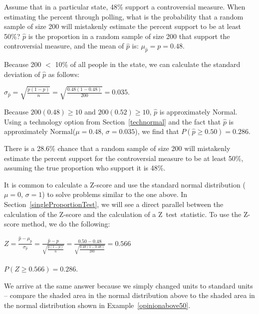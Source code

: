 \begin{examplewrap}
\begin{nexample}{Assume that in a particular state, 48\% support a controversial measure.  When estimating the percent through polling, what is the probability that a random sample of size 200 will mistakenly estimate the percent support to be at least 50\%?}
$\hat{p}$ is the proportion in a random sample of size 200 that support the controversial measure, and the mean of $\hat{p}$ is: $\mu_{\hat{p}} = p = 0.48$.

Because 200 $<$ 10\% of all people in the state, we can calculate the standard deviation of $\hat{p}$ as follows:
\begin{center}
$\sigma_{\hat{p}} = \sqrt{\frac{p(1-p)}{n}} = \sqrt{\frac{0.48(1-0.48)}{200}}= 0.035$.
\end{center}
Because $200(0.48) \ge 10$ and $200(0.52) \ge 10$,  $\hat{p}$ is approximately Normal.  Using a technology option from Section~\ref{technormal} and the fact that $\hat{p}$ is approximately Normal($\mu = 0.48$, $\sigma = 0.035$), we find that $P(\hat{p} \ge 0.50) = 0.286$.\\
\begin{center}
\end{center}
There is a 28.6\% chance that a random sample of size 200 will mistakenly estimate the percent support for the controversial measure to be at least 50\%, assuming the true proportion who support it is 48\%.
\label{opinionabove50}
\end{nexample}
\end{examplewrap}



It is common to calculate a Z-score and use the standard normal distribution ($\mu=0$, $\sigma=1$) to solve problems similar to the one above. In Section~\ref{singleProportionTest}, we will see a direct parallel between the calculation of the Z-score and the calculation of a Z~test~statistic.  To use the Z-score method, we do the following:  
\begin{center}
$Z = \frac{\hat{p} - \mu_{\hat{p}}}{\sigma_{\hat{p}}} = \frac{\hat{p} - p}{\sqrt{\frac{p(1-p)}{n}}} =  \frac{0.50 - 0.48}{\sqrt{\frac{0.48(1-0.48)}{200}}} = 0.566$\\\vspace{3mm}
 \\
$P(Z \ge 0.566) = 0.286$.
\end{center}
We arrive at the same answer because we simply changed units to standard units -- compare the shaded area in the normal distribution above to the shaded area in the normal distribution shown in Example~\ref{opinionabove50}.


